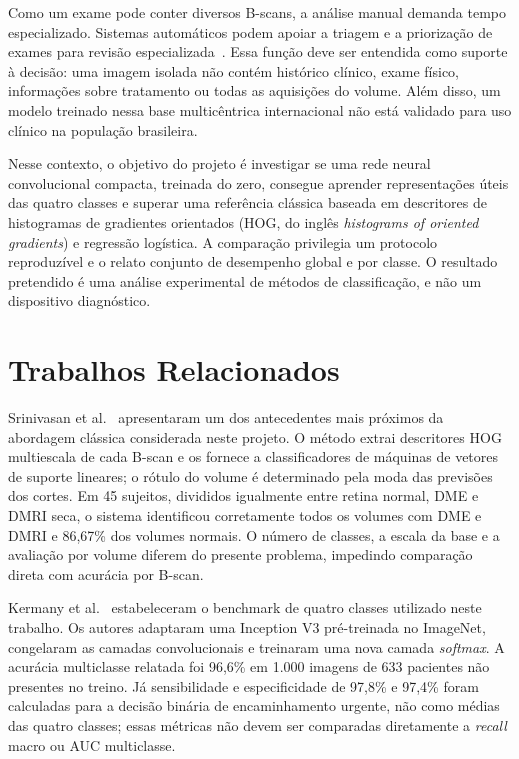 \documentclass[conference]{IEEEtran}
\begin{document}
Como um exame pode conter diversos B-scans, a análise manual demanda tempo especializado. Sistemas automáticos podem apoiar a triagem e a priorização de exames para revisão especializada~\cite{kermany2018,defauw2018}. Essa função deve ser entendida como suporte à decisão: uma imagem isolada não contém histórico clínico, exame físico, informações sobre tratamento ou todas as aquisições do volume. Além disso, um modelo treinado nessa base multicêntrica internacional não está validado para uso clínico na população brasileira.

Nesse contexto, o objetivo do projeto é investigar se uma rede neural convolucional compacta, treinada do zero, consegue aprender representações úteis das quatro classes e superar uma referência clássica baseada em descritores de histogramas de gradientes orientados (HOG, do inglês \textit{histograms of oriented gradients}) e regressão logística. A comparação privilegia um protocolo reproduzível e o relato conjunto de desempenho global e por classe. O resultado pretendido é uma análise experimental de métodos de classificação, e não um dispositivo diagnóstico.

\section{Trabalhos Relacionados}

Srinivasan et al.~\cite{srinivasan2014} apresentaram um dos antecedentes mais próximos da abordagem clássica considerada neste projeto. O método extrai descritores HOG multiescala de cada B-scan e os fornece a classificadores de máquinas de vetores de suporte lineares; o rótulo do volume é determinado pela moda das previsões dos cortes. Em 45 sujeitos, divididos igualmente entre retina normal, DME e DMRI seca, o sistema identificou corretamente todos os volumes com DME e DMRI e 86,67\% dos volumes normais. O número de classes, a escala da base e a avaliação por volume diferem do presente problema, impedindo comparação direta com acurácia por B-scan.

Kermany et al.~\cite{kermany2018} estabeleceram o benchmark de quatro classes utilizado neste trabalho. Os autores adaptaram uma Inception V3 pré-treinada no ImageNet, congelaram as camadas convolucionais e treinaram uma nova camada \textit{softmax}. A acurácia multiclasse relatada foi 96,6\% em 1.000 imagens de 633 pacientes não presentes no treino. Já sensibilidade e especificidade de 97,8\% e 97,4\% foram calculadas para a decisão binária de encaminhamento urgente, não como médias das quatro classes; essas métricas não devem ser comparadas diretamente a \textit{recall} macro ou AUC multiclasse.
\end{document}
